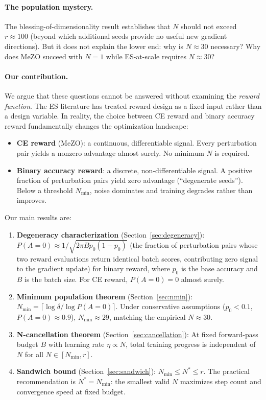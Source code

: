\documentclass[11pt]{article}
\theoremstyle{definition}
\theoremstyle{remark}
\newcommand{\Nmin}{N_{\mathrm{min}}}
\begin{document}
\paragraph{The population mystery.}
The blessing-of-dimensionality result establishes that $N$ should not exceed $r \approx 100$ (beyond which additional seeds provide no useful new gradient directions). But it does not explain the lower end: why is $N \approx 30$ necessary? Why does MeZO succeed with $N=1$ while ES-at-scale requires $N \approx 30$?

\paragraph{Our contribution.}
We argue that these questions cannot be answered without examining the \emph{reward function}. The ES literature has treated reward design as a fixed input rather than a design variable. In reality, the choice between CE reward and binary accuracy reward fundamentally changes the optimization landscape:
\begin{itemize}[leftmargin=*]
  \item \textbf{CE reward} (MeZO): a continuous, differentiable signal. Every perturbation pair yields a nonzero advantage almost surely. No minimum $N$ is required.
  \item \textbf{Binary accuracy reward}: a discrete, non-differentiable signal. A positive fraction of perturbation pairs yield zero advantage (``degenerate seeds''). Below a threshold $\Nmin$, noise dominates and training degrades rather than improves.
\end{itemize}

Our main results are:
\begin{enumerate}[leftmargin=*]
  \item \textbf{Degeneracy characterization} (Section~\ref{sec:degeneracy}): $P(A=0) \approx 1/\sqrt{2\pi B p_0(1-p_0)}$ (the fraction of perturbation pairs whose two reward evaluations return identical batch scores, contributing zero signal to the gradient update) for binary reward, where $p_0$ is the base accuracy and $B$ is the batch size. For CE reward, $P(A=0) = 0$ almost surely.
  \item \textbf{Minimum population theorem} (Section~\ref{sec:nmin}): $\Nmin = \lceil \log\delta / \log P(A=0) \rceil$. Under conservative assumptions ($p_0 < 0.1$, $P(A=0) \approx 0.9$), $\Nmin \approx 29$, matching the empirical $N \approx 30$.
  \item \textbf{N-cancellation theorem} (Section~\ref{sec:cancellation}): At fixed forward-pass budget $B$ with learning rate $\eta \propto N$, total training progress is independent of $N$ for all $N \in [\Nmin, r]$.
  \item \textbf{Sandwich bound} (Section~\ref{sec:sandwich}): $\Nmin \leq N^* \leq r$. The practical recommendation is $N^* = \Nmin$: the smallest valid $N$ maximizes step count and convergence speed at fixed budget.
\end{enumerate}
\end{document}
